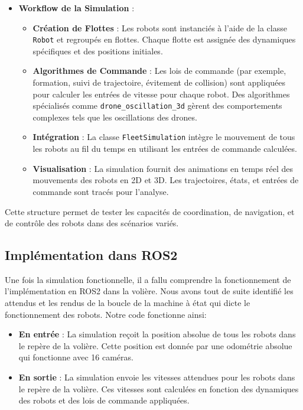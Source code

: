 \documentclass[a4paper,12pt]{article}
\begin{document}
\begin{itemize}
    \item \textbf{Workflow de la Simulation} :
    \begin{itemize}
        \item \textbf{Création de Flottes} : Les robots sont instanciés à l'aide de la classe \texttt{Robot} et regroupés en flottes. Chaque flotte est assignée des dynamiques spécifiques et des positions initiales.
        \item \textbf{Algorithmes de Commande} : Les lois de commande (par exemple, formation, suivi de trajectoire, évitement de collision) sont appliquées pour calculer les entrées de vitesse pour chaque robot. Des algorithmes spécialisés comme \texttt{drone\_oscillation\_3d} gèrent des comportements complexes tels que les oscillations des drones.
        \item \textbf{Intégration} : La classe \texttt{FleetSimulation} intègre le mouvement de tous les robots au fil du temps en utilisant les entrées de commande calculées.
        \item \textbf{Visualisation} : La simulation fournit des animations en temps réel des mouvements des robots en 2D et 3D. Les trajectoires, états, et entrées de commande sont tracés pour l'analyse.
    \end{itemize}
\end{itemize}

Cette structure permet de tester les capacités de coordination, de navigation, et de contrôle des robots dans des scénarios variés.

\subsection*{Implémentation dans ROS2}
Une fois la simulation fonctionnelle, il a fallu comprendre la fonctionnement de l'implémentation en ROS2 dans la volière. Nous avons tout de suite identifié les attendus et les rendus de la boucle de la machine à  état qui dicte le fonctionnement des robots. Notre code fonctionne ainsi:

\begin{itemize}
    \item \textbf{En entrée} : La simulation reçoit la position absolue de tous les robots dans le repère de la volière. Cette position est donnée par une odométrie absolue qui fonctionne avec 16 caméras.
    \item \textbf{En sortie} : La simulation envoie les vitesses attendues pour les robots dans le repère de la volière. Ces vitesses sont calculées en fonction des dynamiques des robots et des lois de commande appliquées.
\end{itemize}
\end{document}
